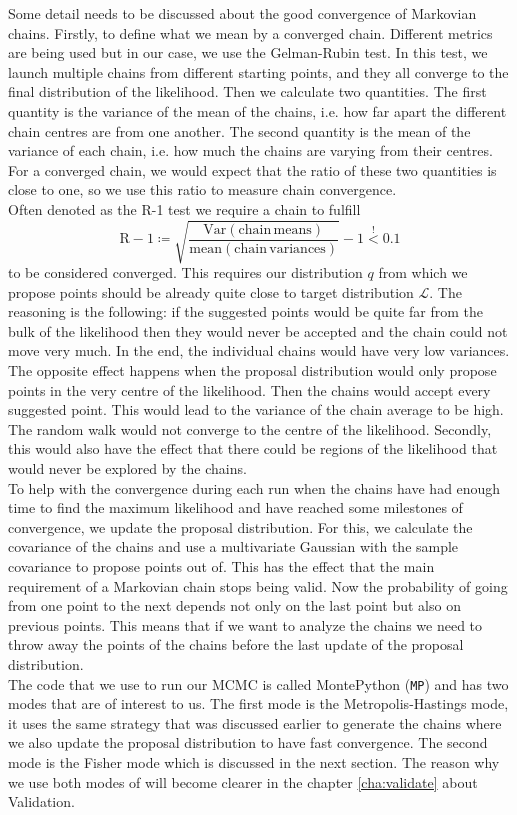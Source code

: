 \documentclass[../main.tex]{subfiles}
\begin{document}
Some detail needs to be discussed about the good convergence of Markovian chains. Firstly, to define what we mean by a converged chain. Different metrics are being used but in our case, we use the Gelman-Rubin test. In this test, we launch multiple chains from different starting points, and they all converge to the final distribution of the likelihood. Then we calculate two quantities. The first quantity is the variance of the mean of the chains, i.e. how far apart the different chain centres are from one another. The second quantity is the mean of the variance of each chain, i.e. how much the chains are varying from their centres. For a converged chain, we would expect that the ratio of these two quantities is close to one, so we use this ratio to measure chain convergence.\\
Often denoted as the R-1 test we require a chain to fulfill 
\begin{equation}
 \mathrm{R}-1 \coloneqq \sqrt{\frac{\mathrm{Var(chain\,means)}}{\mathrm{mean(chain\,variances)}}} -1 \overset{!}{<} 0.1
\end{equation}
to be considered converged. This requires our distribution $q$ from which we propose points should be already quite close to target distribution $\mathcal{L}$. The reasoning is the following: if the suggested points would be quite far from the bulk of the likelihood then they would never be accepted and the chain could not move very much. In the end, the individual chains would have very low variances. The opposite effect happens when the proposal distribution would only propose points in the very centre of the likelihood. Then the chains would accept every suggested point. This would lead to the variance of the chain average to be high. The random walk would not converge to the centre of the likelihood. Secondly, this would also have the effect that there could be regions of the likelihood that would never be explored by the chains.\\
To help with the convergence during each run when the chains have had enough time to find the maximum likelihood and have reached some milestones of convergence, we update the proposal distribution. For this, we calculate the covariance of the chains and use a multivariate Gaussian with the sample covariance to propose points out of. This has the effect that the main requirement of a Markovian chain stops being valid. Now the probability of going from one point to the next depends not only on the last point but also on previous points. This means that if we want to analyze the chains we need to throw away the points of the chains before the last update of the proposal distribution.\\
The code that we use to run our MCMC is called MontePython ({\tt MP}) and has two modes that are of interest to us. The first mode is the Metropolis-Hastings mode, it uses the same strategy that was discussed earlier to generate the chains where we also update the proposal distribution to have fast convergence. The second mode is the Fisher mode which is discussed in the next section. The reason why we use both modes of \montepython will become clearer in the chapter \ref{cha:validate} about Validation.  
\end{document}
